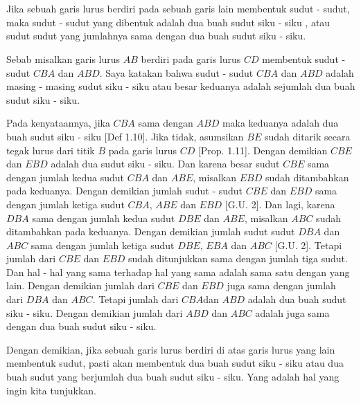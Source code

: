 \documentclass[a4paper]{book}
\begin{document}
\section*{\centering \thesection} 
Jika sebuah garis lurus berdiri pada sebuah garis lain membentuk sudut - sudut, maka
sudut - sudut yang dibentuk adalah dua buah sudut siku - siku , atau sudut sudut yang
jumlahnya sama dengan dua buah sudut siku - siku.
\begin{center}
\end{center}

Sebab misalkan garis lurus $AB$ berdiri pada garis lurus $CD$ membentuk 
sudut - sudut $CBA$ dan $ABD$. Saya katakan bahwa sudut - sudut $CBA$ dan
$ABD$ adalah masing - masing sudut siku - siku atau besar keduanya adalah 
sejumlah dua buah sudut siku - siku.

Pada kenyataannya, jika $CBA$ sama dengan $ABD$ maka keduanya adalah dua buah 
sudut siku - siku [Def 1.10]. Jika tidak, asumsikan $BE$ sudah ditarik secara
tegak lurus dari titik $B$ pada garis lurus $CD$ [Prop. 1.11]. Dengan demikian
$CBE$ dan $EBD$ adalah dua sudut siku - siku. Dan karena besar sudut $CBE$ sama 
dengan jumlah kedua sudut $CBA$ dan $ABE$, misalkan $EBD$ sudah ditambahkan pada 
keduanya. Dengan demikian jumlah sudut - sudut $CBE$ dan $EBD$ sama dengan
jumlah ketiga sudut $CBA$, $ABE$ dan $EBD$ [G.U. 2]. Dan lagi, karena $DBA$
sama dengan jumlah kedua sudut $DBE$ dan $ABE$, misalkan $ABC$ sudah 
ditambahkan pada keduanya. Dengan demikian jumlah sudut sudut $DBA$  dan $ABC$
sama dengan jumlah ketiga sudut $DBE$, $EBA$ dan $ABC$ [G.U. 2]. Tetapi jumlah
dari $CBE$ dan $EBD$ sudah ditunjukkan sama dengan jumlah tiga sudut. Dan hal -
hal yang sama terhadap hal yang sama adalah sama satu dengan yang lain. Dengan
demikian jumlah dari $CBE$ dan $EBD$ juga sama dengan jumlah dari $DBA$ dan 
$ABC$. Tetapi jumlah dari $CBA$dan $ABD$ adalah dua buah sudut siku - siku. 
Dengan demikian jumlah dari $ABD$ dan $ABC$ adalah juga sama dengan dua buah
sudut siku - siku.

Dengan demikian, jika sebuah garis lurus berdiri di atas garis lurus yang lain
membentuk sudut, pasti akan membentuk dua buah sudut siku - siku atau dua buah
sudut yang berjumlah dua buah sudut siku - siku. Yang adalah hal yang ingin
kita tunjukkan.
\end{document}
